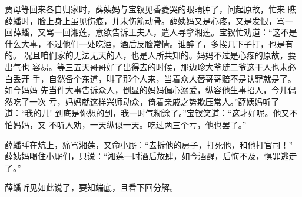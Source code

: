 贾母等回来各自归家时，薛姨妈与宝钗见香菱哭的眼睛肿了，问起原故，忙来
瞧薛蟠时，脸上身上虽见伤痕，并未伤筋动骨。薛姨妈又是心疼，又是发恨，骂一
回薛蟠，又骂一回湘莲，意欲告诉王夫人，遣人寻拿湘莲。宝钗忙劝道：“这不是
什么大事，不过他们一处吃酒，酒后反脸常情。谁醉了，多挨几下子打，也是有的。
况且咱们家的无法无天的人，也是人所共知的。妈妈不过是心疼的原故，要出气也
容易。等三五天哥哥好了出得去的时候，那边珍大爷琏二爷这干人也未必白丢开
手，自然备个东道，叫了那个人来，当着众人替哥哥赔不是认罪就是了。如今妈妈
先当件大事告诉众人，倒显的妈妈偏心溺爱，纵容他生事招人，今儿偶然吃了一次
亏，妈妈就这样兴师动众，倚着亲戚之势欺压常人。”薛姨妈听了道：“我的儿!
到底是你想的到，我一时气糊涂了。”宝钗笑道：“这才好呢。他又不怕妈妈，又
不听人劝，一天纵似一天。吃过两三个亏，他也罢了。”

薛蟠睡在炕上，痛骂湘莲，又命小厮：“去拆他的房子，打死他，和他打官司！”
薛姨妈喝住小厮们，只说：“湘莲一时酒后放肆，如今酒醒，后悔不及，惧罪逃走
了。”

薛蟠听见如此说了，要知端底，且看下回分解。